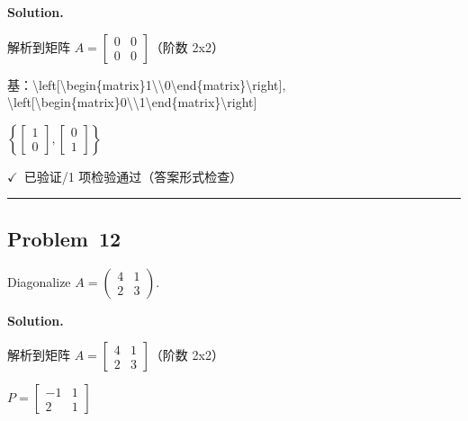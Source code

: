 \documentclass[12pt, a4paper]{article}
\newcommand{\problem}[1]{\subsection*{Problem~#1}}
\newcommand{\solution}{%
  \par\noindent
  {\color{solutiongreen}\bfseries Solution.}\par
}
\newcommand{\verifyok}{\textcolor{solutiongreen}{\ensuremath{\checkmark}\ 已验证}}
\begin{document}
\solution

\begin{stepbox}
解析到矩阵 $A = \left[\begin{matrix}0 & 0\\0 & 0\end{matrix}\right]$（阶数 2x2）
\end{stepbox}

\begin{stepbox}
基：\textbackslash{}left[\textbackslash{}begin\{matrix\}1\textbackslash{}\textbackslash{}0\textbackslash{}end\{matrix\}\textbackslash{}right], \textbackslash{}left[\textbackslash{}begin\{matrix\}0\textbackslash{}\textbackslash{}1\textbackslash{}end\{matrix\}\textbackslash{}right]
\end{stepbox}

\begin{center}
$\boxed{\left\{ \left[\begin{matrix}1\\0\end{matrix}\right], \left[\begin{matrix}0\\1\end{matrix}\right] \right\}}$
\end{center}

\begin{verifybox}\small \verifyok{}/1 项检验通过（答案形式检查） \end{verifybox}

\vspace{0.8em}\hrule\vspace{0.8em}

\problem{12}

\begin{stepbox}
Diagonalize $A = \begin{pmatrix} 4 & 1 \\ 2 & 3 \end{pmatrix}$.
\end{stepbox}

\solution

\begin{stepbox}
解析到矩阵 $A = \left[\begin{matrix}4 & 1\\2 & 3\end{matrix}\right]$（阶数 2x2）
\end{stepbox}

\begin{stepbox}
$P = \left[\begin{matrix}-1 & 1\\2 & 1\end{matrix}\right]$
\end{stepbox}
\end{document}
